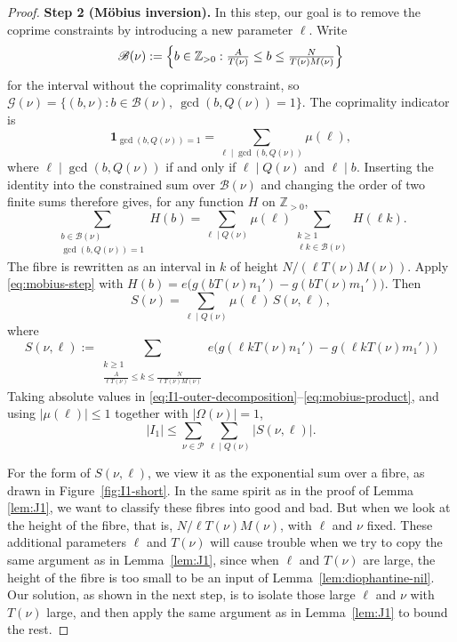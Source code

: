\begin{proof}
\smallskip\noindent\textbf{Step 2 (M\"obius inversion).}
In this step, our goal is to remove the coprime constraints by introducing a new parameter $\ell$.
Write
\[
\mathscr B(\nu)
:=\Bigl\{b\in\mathbb Z_{>0}:
\tfrac{A}{T(\nu)}\leq b\leq\tfrac{N}{T(\nu)M(\nu)}\Bigr\}
\]
for the interval without the coprimality constraint, so \(\mathscr G(\nu)=\bigl\{(b,\nu):b\in\mathscr B(\nu),\ \gcd(b,Q(\nu))=1\bigr\}\).
The coprimality indicator is
\[
\mathbf 1_{\gcd(b,Q(\nu))=1}
=\sum_{\ell\mid\gcd(b,Q(\nu))}\mu(\ell),
\]
where \(\ell\mid\gcd(b,Q(\nu))\) if and only if \(\ell\mid Q(\nu)\) and \(\ell\mid b\).
Inserting the identity into the constrained sum over \(\mathscr B(\nu)\) and changing the order of two finite sums therefore gives, for any function \(H\) on \(\mathbb Z_{>0}\),
\begin{equation}\label{eq:mobius-step}
\sum_{\substack{b\in\mathscr B(\nu)\\\gcd(b,Q(\nu))=1}}H(b)
=\sum_{\ell\mid Q(\nu)}\mu(\ell)
\sum_{\substack{k\geq1\\\ell k\in\mathscr B(\nu)}}H(\ell k).
\end{equation}
The fibre is rewritten as an interval in $k$ of height $N/(\ell T(\nu)M(\nu))$.
Apply \eqref{eq:mobius-step} with
$H(b)=e\bigl(g(bT(\nu)n_1')-g(bT(\nu)m_1')\bigr)$.  Then
\begin{equation}\label{eq:mobius-product}
S(\nu)=\sum_{\ell\mid Q(\nu)}\mu(\ell)\,S(\nu,\ell),
\end{equation}
where
\[
S(\nu,\ell)
:=\sum_{\substack{k\geq1\\\tfrac{A}{\ell T(\nu)}\leq k\leq\tfrac{N}{\ell T(\nu)M(\nu)}}}
e\bigl(g(\ell kT(\nu)n_1')-g(\ell kT(\nu)m_1')\bigr)
\]
Taking absolute values in
\eqref{eq:I1-outer-decomposition}--\eqref{eq:mobius-product}, and using
$|\mu(\ell)|\leq1$ together with $|\Omega(\nu)|=1$,
\begin{equation}\label{eq:I1-Mobius}
|I_1|
\leq\sum_{\nu\in\mathscr P}\sum_{\ell\mid Q(\nu)}\bigl|S(\nu,\ell)\bigr|.
\end{equation}
 
For the form of $S(\nu,\ell)$, we view it as the exponential sum over
a fibre, as drawn in Figure~\ref{fig:I1-short}.
In the same spirit as in the proof of Lemma \ref{lem:J1}, we want to classify these fibres into good and bad.
But when we look at the height of the fibre, that is, $N/\ell T(\nu)M(\nu)$, with $\ell$ and $\nu$
fixed.
These additional parameters $\ell$ and $T(\nu)$ will cause trouble when we try to 
copy the same argument as in Lemma~\ref{lem:J1}, since
when $\ell$ and $T(\nu)$ are large, the height of the fibre is too small to be an input of Lemma~\ref{lem:diophantine-nil}.
Our solution, as shown in the next step, is to isolate those large $\ell$ and $\nu$ with $T(\nu)$ large, and then apply the same argument as in Lemma~\ref{lem:J1} to bound the rest.



\end{proof}
